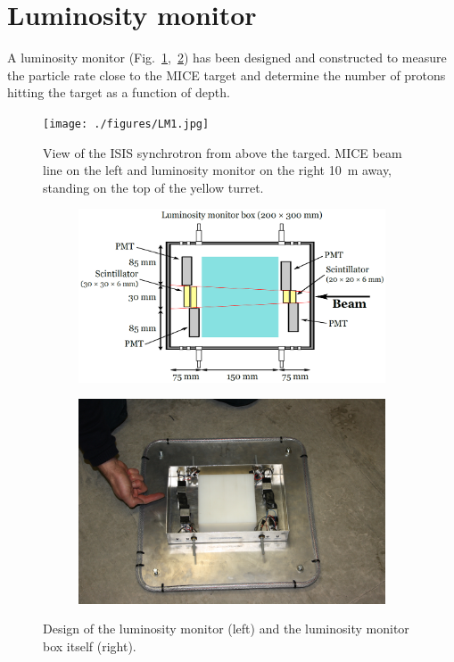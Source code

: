 \documentclass[a4paper,11pt]{article}
\begin{document}
\section{Luminosity monitor}
A luminosity monitor (Fig.~\ref{fig:LM1},~\ref{fig:LM2}) has been designed and constructed to measure the particle rate close to the MICE target and determine the number of protons hitting the target as a function of depth.
\begin{figure}
  \begin{center}
    \texttt{[image: ./figures/LM1.jpg]}
    \caption{View of the ISIS synchrotron from above the targed. MICE beam line on the left and luminosity monitor on the right 10~m away, standing on the top of the yellow turret.}
    \label{fig:LM1}
  \end{center}
\end{figure}

\begin{figure}
  \begin{center}
  \begin{subfigure}
  \centering
    \includegraphics[width=0.59\columnwidth]{./figures/LM2.png}
  \end{subfigure}
  \begin{subfigure}
  \centering
    \includegraphics[width=0.39\columnwidth]{./figures/LM3.jpg}
  \end{subfigure}
  \caption{Design of the luminosity monitor (left) and the luminosity monitor box itself (right).}
  \label{fig:LM2}
  \end{center}
\end{figure}
\end{document}
